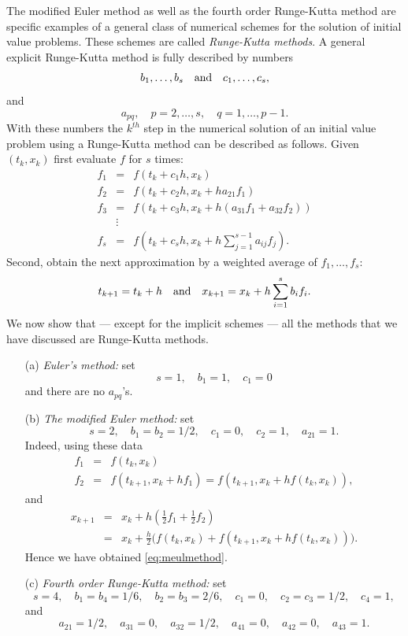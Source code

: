 \documentclass{ximera}
\begin{document}
The modified Euler method as well as the fourth order Runge-Kutta
method are specific examples of a general class of 
numerical schemes for the solution of initial value 
problems.
These schemes are called {\em Runge-Kutta methods}.  A general explicit 
Runge-Kutta method is fully described by numbers
\[
b_1,\ldots,b_s\quad\mbox{and}\quad c_1,\ldots,c_s,
\]
and 
\[
a_{pq}, \quad p=2,\ldots,s,\quad q=1,\ldots,p-1.
\]
With these numbers the $k^{th}$ step in the numerical solution of an 
initial value problem using a Runge-Kutta method can be described
as follows. Given $(t_k,x_k)$ first evaluate $f$ for $s$ times:
\begin{eqnarray*}
f_1 & = & f\left( t_k+c_1 h, x_k \right)\\
f_2 & = & f\left( t_k+c_2 h, x_k +ha_{21} f_1\right)\\
f_3 & = & f\left( t_k+c_3 h, x_k +h(a_{31} f_1 + a_{32} f_2)\right)\\
& \vdots &\\
f_s & = & f\left( t_k+c_s h, x_k +h\sum_{j=1}^{s-1}a_{ij} f_j\right).
\end{eqnarray*}
Second, obtain the next approximation by a weighted average
of $f_1,\ldots,f_s$:
\[
t_{k+1} = t_k+h \quad\mbox{and}\quad x_{k+1} = x_k + h\sum_{i=1}^s b_i f_i.
\]
We now show that --- except for the implicit schemes ---
all the methods that we have discussed are Runge-Kutta methods.

\begin{itemize}
\item[(a)] {\em Euler's method:} 
set
\[
s=1,\quad b_1=1,\quad c_1=0 
\]
and there are no $a_{pq}$'s.
\item[(b)] {\em The modified Euler method:} 
 set
\[
s=2,\quad b_1=b_2=1/2,\quad c_1=0,\quad c_2=1,\quad a_{21}=1.
\]
Indeed, using these data
\begin{eqnarray*}
f_1 &=& f(t_k,x_k)\\
f_2 &=& f(t_{k+1},x_k+hf_1)=f(t_{k+1},x_k+hf(t_k,x_k)),
\end{eqnarray*}
and
\begin{eqnarray*}
x_{k+1} &=& x_k + h \left(\frac{1}{2}f_1 + \frac{1}{2}f_2\right)\\
&=& x_k + \frac{h}{2}
\Big( f(t_k, x_k)+f(t_{k+1}, x_k + h f(t_k, x_k))\Big).
\end{eqnarray*}
Hence we have obtained \eqref{eq:meulmethod}.
\item[(c)] {\em Fourth order Runge-Kutta method:} 
set 
\[
s=4,\quad b_1=b_4=1/6,\quad b_2=b_3=2/6,\quad 
c_1=0,\quad c_2=c_3=1/2,\quad c_4=1,
\]
and 
\[
a_{21}=1/2,\quad a_{31}=0,\quad a_{32}=1/2,\quad
a_{41}=0,\quad a_{42}=0,\quad a_{43}=1.
\]
\end{itemize}




\end{document}
